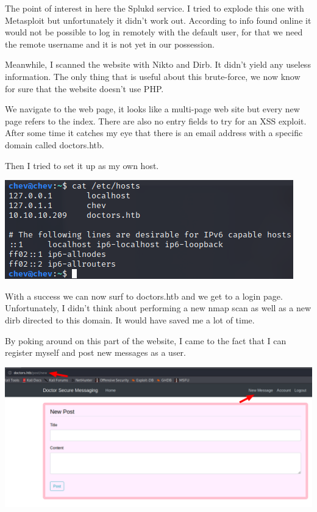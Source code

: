 \documentclass[../main.tex]{subfiles}
\begin{document}
The point of interest in here the Splukd service. I tried to explode this one with Metasploit but unfortunately it didn't work out. According to info found online it would not be possible to log in remotely with the default user, for that we need the remote username and it is not yet in our possession.

Meanwhile, I scanned the website with Nikto and Dirb. It didn't yield any useless information. The only thing that is useful about this brute-force, we now know for sure that the website doesn't use PHP.

We navigate to the web page, it looks like a multi-page web site but every new page refers to the index. There are also no entry fields to try for an XSS exploit. After some time it catches my eye that there is an email address with a specific domain called doctors.htb.

Then I tried to set it up as my own host.

\includegraphics[width=\linewidth]{images/Nicolai/doctor_etc_hosts.png}

With a success we can now surf to doctors.htb and we get to a login page. Unfortunately, I didn't think about performing a new nmap scan as well as a new dirb directed to this domain. It would have saved me a lot of time.

By poking around on this part of the website, I came to the fact that I can register myself and post new messages as a user.

\includegraphics[width=\linewidth]{images/Nicolai/doctor_post_new.png}
\end{document}
